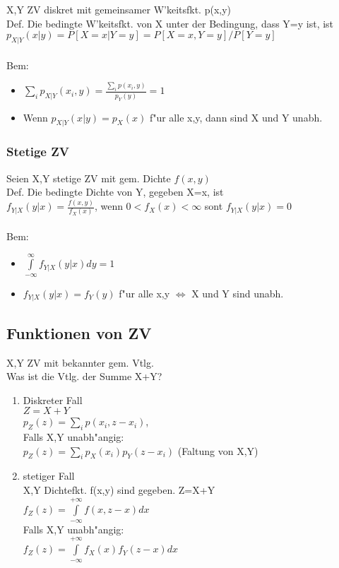\documentclass[10pt, a4paper, twocolumn]{scrartcl}
\begin{document}
X,Y ZV diskret mit gemeinsamer W'keitsfkt. p(x,y)\\
Def. Die bedingte W'keitsfkt. von X unter der Bedingung, dass Y=y ist, ist $p_{X|Y}(x|y)=P[X=x|Y=y]=P[X=x,Y=y]/P[Y=y]$\\\\

Bem:
\begin{itemize}
 \item $\sum\limits_i p_{X|Y}(x_i,y)=\frac{\sum\limits_i p(x_i,y)}{p_Y(y)}=1$
 \item Wenn $p_{X|Y}(x|y)=p_X(x)$ f"ur alle x,y, dann sind X und Y unabh.
\end{itemize}

\subsubsection{Stetige ZV}

Seien X,Y stetige ZV mit gem. Dichte $f(x,y)$\\
Def. Die bedingte Dichte von Y, gegeben X=x, ist\\
$f_{Y|X}(y|x)=\frac{f(x,y)}{f_X(x)}$, wenn $0<f_X(x)<\infty$ sont $f_{Y|X}(y|x)=0$\\\\

Bem:
\begin{itemize}
 \item $\int\limits^\infty_{-\infty}f_{Y|X}(y|x)dy=1$
 \item $f_{Y|X}(y|x)=f_Y(y)$ f"ur alle x,y $\Leftrightarrow$ X und Y sind unabh.
\end{itemize}


\subsection{Funktionen von ZV}

X,Y ZV mit bekannter gem. Vtlg.\\

Was ist die Vtlg. der Summe X+Y?\\
\begin{enumerate}
 \item Diskreter Fall\\
  $Z=X+Y$\\
  $p_Z(z)=\sum\limits_i p(x_i,z-x_i)$,\\
  Falls X,Y unabh"angig:\\
  $p_Z(z)=\sum\limits_i p_X(x_i)p_Y(z-x_i)$ (Faltung von X,Y)
 \item stetiger Fall\\
  X,Y Dichtefkt. f(x,y) sind gegeben. Z=X+Y\\
  $f_Z(z)=\int\limits^{+\infty}_{-\infty} f(x,z-x)dx$\\
  Falls X,Y unabh"angig:\\
  $f_Z(z)=\int\limits^{+\infty}_{-\infty}f_X(x)f_Y(z-x)dx$
\end{enumerate}
\end{document}
